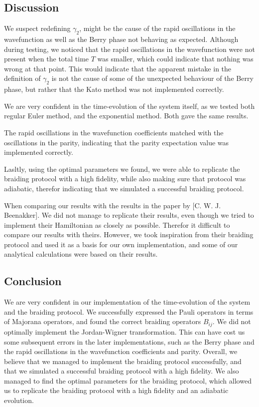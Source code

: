 \documentclass[11pt,landscape]{article}
\begin{document}
\subsection{Discussion}\label{discussion}

We suspect redefining \(γ_2\), might be the cause of the rapid
oscillations in the wavefunction as well as the Berry phase not behaving
as expected. Although during testing, we noticed that the rapid
oscillations in the wavefunction were not present when the total time
\(T\) was smaller, which could indicate that nothing was wrong at that
point. This would indicate that the apparent mistake in the definition
of \(γ_2\) is not the cause of some of the unexpected behaviour of the
Berry phase, but rather that the Kato method was not implemented
correctly.

We are very confident in the time-evolution of the system itself, as we
tested both regular Euler method, and the exponential method. Both gave
the same results.

The rapid oscillations in the wavefunction coefficients matched with the
oscillations in the parity, indicating that the parity expectation value
was implemented correctly.

Lasltly, using the optimal parameters we found, we were able to
replicate the braiding protocol with a high fidelity, while also making
sure that protocol was adiabatic, therefor indicating that we simulated
a successful braiding protocol.

When comparing our results with the results in the paper by {[}C. W. J.
Beenakker{]}. We did not manage to replicate their results, even though
we tried to implement their Hamiltonian as closely as possible. Therefor
it difficult to compare our results with theirs. However, we took
inspiration from their braiding protocol and used it as a basis for our
own implementation, and some of our analytical calculations were based
on their results.

\subsection{Conclusion}\label{conclusion}

We are very confident in our implementation of the time-evolution of the
system and the braiding protocol. We successfully expressed the Pauli
operators in terms of Majorana operators, and found the correct braiding
operators \(B_{ij}\). We did not optimally implement the Jordan-Wigner
transformation. This can have cost us some subsequent errors in the
later implementations, such as the Berry phase and the rapid
oscillations in the wavefunction coefficients and parity. Overall, we
believe that we managed to implement the braiding protocol successfully,
and that we simulated a successful braiding protocol with a high
fidelity. We also managed to find the optimal parameters for the
braiding protocol, which allowed us to replicate the braiding protocol
with a high fidelity and an adiabatic evolution.
\end{document}
